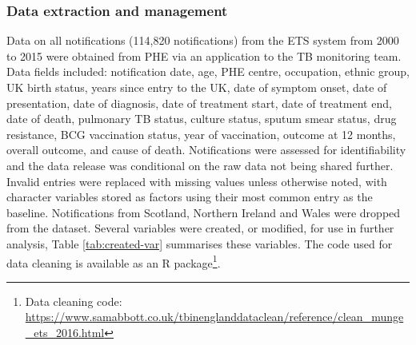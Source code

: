 \documentclass[11pt,twoside]{bristolthesis}
\begin{document}
  \hypertarget{data-extraction-and-management}{%
  \subsubsection{Data extraction and management}\label{data-extraction-and-management}}
  
  Data on all notifications (114,820 notifications) from the ETS system from 2000 to 2015 were obtained from PHE via an application to the TB monitoring team. Data fields included: notification date, age, PHE centre, occupation, ethnic group, UK birth status, years since entry to the UK, date of symptom onset, date of presentation, date of diagnosis, date of treatment start, date of treatment end, date of death, pulmonary TB status, culture status, sputum smear status, drug resistance, BCG vaccination status, year of vaccination, outcome at 12 months, overall outcome, and cause of death. Notifications were assessed for identifiability and the data release was conditional on the raw data not being shared further. Invalid entries were replaced with missing values unless otherwise noted, with character variables stored as factors using their most common entry as the baseline. Notifications from Scotland, Northern Ireland and Wales were dropped from the dataset. Several variables were created, or modified, for use in further analysis, Table \ref{tab:created-var} summarises these variables. The code used for data cleaning is available as an R package\footnote{Data cleaning code: \url{https://www.samabbott.co.uk/tbinenglanddataclean/reference/clean_munge_ets_2016.html}}.
  
\end{document}
